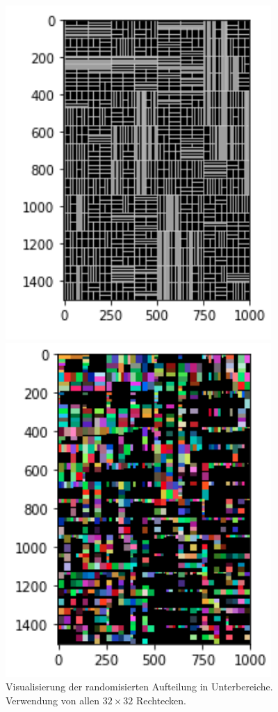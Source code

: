 \documentclass[12pt, ngerman, utf8]{article}
\begin{document}
\begin{figure}[h]
\centering
\begin{minipage}{.45\textwidth}
  \centering
  \includegraphics[width=0.9\textwidth]{./imgs/picwall-tree.png}
  \caption{Visualisierung der randomisierten Aufteilung in Unterbereiche. Verwendung von allen $32 \times 32$ Rechtecken.}
  \label{fig:picwall-tree}
\end{minipage}%
\hfill
\begin{minipage}{.45\textwidth}
  \centering
  \includegraphics[width=0.9\textwidth]{./imgs/picwall-vis.png}

\end{minipage}
\end{figure}
\end{document}
